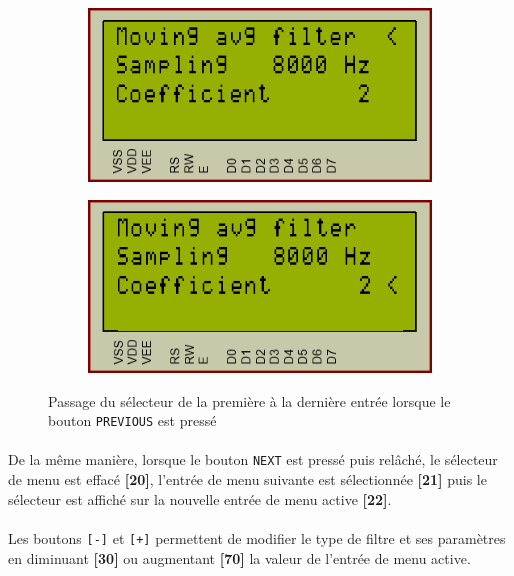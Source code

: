 \documentclass{article}
\begin{document}
    \begin{figure}[H]
        \centering
        \begin{subfigure}[b]{.34\textwidth}
            \centering
            \includegraphics[width=.9\textwidth]{./images/previous_a.png}
        \end{subfigure}
        \begin{subfigure}[b]{.34\textwidth}
            \centering
            \includegraphics[width=.9\textwidth]{./images/previous_b.png}
        \end{subfigure}
        \caption{Passage du sélecteur de la première à la dernière entrée lorsque le bouton \texttt{PREVIOUS} est pressé}
    \end{figure}

    \paragraph{}
    De la même manière, lorsque le bouton \texttt{NEXT} est pressé puis relâché, le sélecteur de menu est effacé \textbf{[20]}, l'entrée de menu suivante est sélectionnée \textbf{[21]} puis le sélecteur est affiché sur la nouvelle entrée de menu active \textbf{[22]}.

    \paragraph{}
    Les boutons \texttt{[-]} et \texttt{[+]} permettent de modifier le type de filtre et ses paramètres en diminuant \textbf{[30]} ou augmentant \textbf{[70]} la valeur de l'entrée de menu active.
\end{document}
